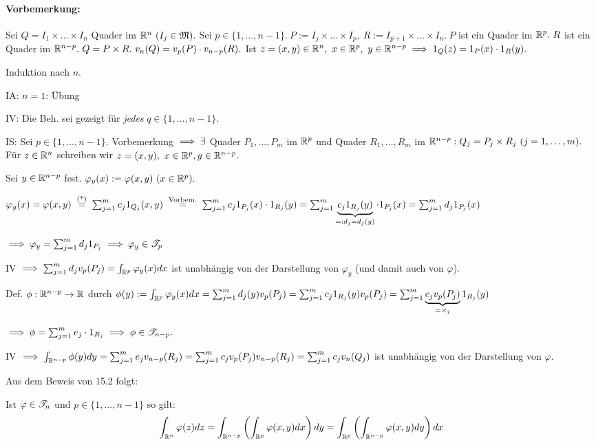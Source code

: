 \documentclass{article}
\begin{document}
\paragraph{Vorbemerkung:} Sei $Q=I_1\times\ldots\times I_n$ Quader im $\mathbb{R}^n\ (I_j\in\mathfrak{M}).$ Sei $p\in\{1,\ldots,n-1\}.\ P:=I_j\times\ldots\times I_p,\ R:=I_{p+1}\times\ldots\times I_n.\ P$ ist ein Quader im $\mathbb{R}^p.\ R$ ist ein Quader im $\MdR^{n-p}.\ Q=P\times R.\ v_n(Q)=v_p(P)\cdot v_{n-p}(R).$ Ist $z=(x,y)\in\mathbb{R}^n,\ x\in\mathbb{R}^p,\ y\in\mathbb{R}^{n-p} \implies 1_Q(z) = 1_P(x)\cdot1_R(y).$

\begin{beweis}[von 15.2]
Induktion nach $n$.

IA: $n=1$: Übung

IV: Die Beh. sei gezeigt für \emph{jedes} $q\in\{1,\ldots,n-1\}$.

IS: Sei $p\in\{1,\ldots,n-1\}.$ Vorbemerkung $\implies \exists$ Quader $P_1,\ldots,P_m$ im $\mathbb{R}^p$ und Quader $R_1,\ldots,R_m$ im $\MdR^{n-p}: Q_j=P_j\times R_j\ (j=1,\ldots,m).$ Für $z\in\mathbb{R}^n$ schreiben wir $z=(x,y),\ x\in\mathbb{R}^p, y\in\mathbb{R}^{n-p}.$

Sei $y\in\mathbb{R}^{n-p}$ fest. $\varphi_y(x):=\varphi(x,y)\ (x\in\MdR^p).$

$\varphi_y(x)=\varphi(x,y) \gleichnach{(*)} \sum_{j=1}^m c_j1_{Q_j}(x,y) \gleichnach{Vorbem.}\sum_{j=1}^m c_j1_{P_j}(x)\cdot1_{R_j}(y) = \sum_{j=1}^m \underbrace{c_j1_{R_j}(y)}_{=:d_j=d_j(y)}\cdot1_{P_j}(x) = \sum_{j=1}^m d_j1_{P_j}(x)$

$\implies \varphi_y = \sum_{j=1}^m d_j1_{P_j} \implies \varphi_y \in \mathscr{T}_p$

IV $\implies \sum_{j=1}^m d_jv_p(P_j) = \int_{\mathbb{R}^p}\varphi_y(x)dx$ ist unabhängig von der Darstellung von $\varphi_y$ (und damit auch von $\varphi$).

Def. $\phi:\mathbb{R}^{n-p}\to\mathbb{R}$ durch $\phi(y):=\int_{\mathbb{R}^p}\varphi_y(x)dx = \sum_{j=1}^m d_j(y)v_p(P_j) = \sum_{j=1}^m c_j1_{R_j}(y)v_p(P_j) = \sum_{j=1}^m \underbrace{c_jv_p(P_j)}_{=:e_j}1_{R_j}(y)$

$\implies \phi = \sum_{j=1}^m e_j\cdot1_{R_j} \implies \phi \in \mathscr{T}_{n-p}.$

IV $\implies \int_{\mathbb{R}^{n-p}}\phi(y)dy = \sum_{j=1}^m e_jv_{n-p}(R_j) = \sum_{j=1}^m c_jv_p(P_j)v_{n-p}(R_j) = \sum_{j=1}^m c_jv_n(Q_j)$ ist unabhängig von der Darstellung von $\varphi$.
\end{beweis}

Aus dem Beweis von 15.2 folgt:

\begin{satz}
Ist $\varphi\in\mathscr{T}_n$ und $p\in\{1,\ldots,n-1\}$ so gilt: $$\int_{\mathbb{R}^n}\varphi(z)dz = \int_{\mathbb{R}^{n-p}}\left(\int_{\mathbb{R}^p}\varphi(x,y)dx\right)dy = \int_{\mathbb{R}^p}\left(\int_{\mathbb{R}^{n-p}}\varphi(x,y)dy\right)dx$$
\end{satz}
\end{document}
